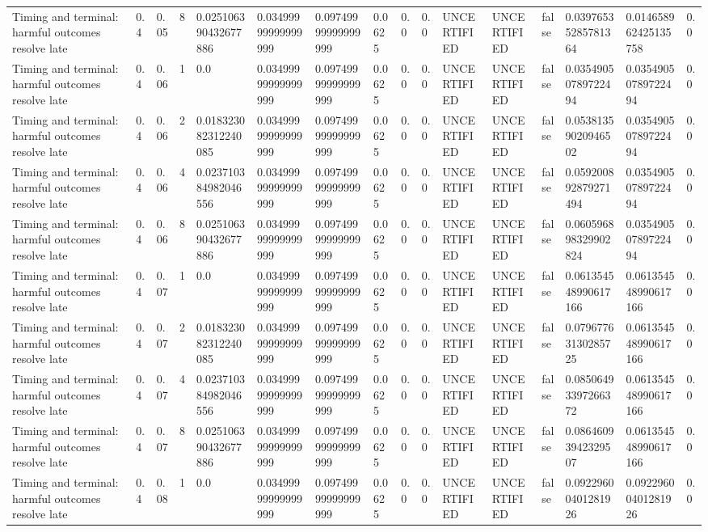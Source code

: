 \begin{tabular}{llllllllllllllll}
Timing and terminal: harmful outcomes resolve late & 0.4 & 0.05 & 8 & 0.025106390432677886 & 0.03499999999999999 & 0.09749999999999999 & 0.0625 & 0.0 & 0.0 & UNCERTIFIED & UNCERTIFIED & false & 0.03976535285781364 & 0.014658962425135758 & 0.0 \\
Timing and terminal: harmful outcomes resolve late & 0.4 & 0.06 & 1 & 0.0 & 0.03499999999999999 & 0.09749999999999999 & 0.0625 & 0.0 & 0.0 & UNCERTIFIED & UNCERTIFIED & false & 0.03549050789722494 & 0.03549050789722494 & 0.0 \\
Timing and terminal: harmful outcomes resolve late & 0.4 & 0.06 & 2 & 0.018323082312240085 & 0.03499999999999999 & 0.09749999999999999 & 0.0625 & 0.0 & 0.0 & UNCERTIFIED & UNCERTIFIED & false & 0.05381359020946502 & 0.03549050789722494 & 0.0 \\
Timing and terminal: harmful outcomes resolve late & 0.4 & 0.06 & 4 & 0.023710384982046556 & 0.03499999999999999 & 0.09749999999999999 & 0.0625 & 0.0 & 0.0 & UNCERTIFIED & UNCERTIFIED & false & 0.059200892879271494 & 0.03549050789722494 & 0.0 \\
Timing and terminal: harmful outcomes resolve late & 0.4 & 0.06 & 8 & 0.025106390432677886 & 0.03499999999999999 & 0.09749999999999999 & 0.0625 & 0.0 & 0.0 & UNCERTIFIED & UNCERTIFIED & false & 0.060596898329902824 & 0.03549050789722494 & 0.0 \\
Timing and terminal: harmful outcomes resolve late & 0.4 & 0.07 & 1 & 0.0 & 0.03499999999999999 & 0.09749999999999999 & 0.0625 & 0.0 & 0.0 & UNCERTIFIED & UNCERTIFIED & false & 0.061354548990617166 & 0.061354548990617166 & 0.0 \\
Timing and terminal: harmful outcomes resolve late & 0.4 & 0.07 & 2 & 0.018323082312240085 & 0.03499999999999999 & 0.09749999999999999 & 0.0625 & 0.0 & 0.0 & UNCERTIFIED & UNCERTIFIED & false & 0.07967763130285725 & 0.061354548990617166 & 0.0 \\
Timing and terminal: harmful outcomes resolve late & 0.4 & 0.07 & 4 & 0.023710384982046556 & 0.03499999999999999 & 0.09749999999999999 & 0.0625 & 0.0 & 0.0 & UNCERTIFIED & UNCERTIFIED & false & 0.08506493397266372 & 0.061354548990617166 & 0.0 \\
Timing and terminal: harmful outcomes resolve late & 0.4 & 0.07 & 8 & 0.025106390432677886 & 0.03499999999999999 & 0.09749999999999999 & 0.0625 & 0.0 & 0.0 & UNCERTIFIED & UNCERTIFIED & false & 0.08646093942329507 & 0.061354548990617166 & 0.0 \\
Timing and terminal: harmful outcomes resolve late & 0.4 & 0.08 & 1 & 0.0 & 0.03499999999999999 & 0.09749999999999999 & 0.0625 & 0.0 & 0.0 & UNCERTIFIED & UNCERTIFIED & false & 0.09229600401281926 & 0.09229600401281926 & 0.0 \\

\end{tabular}
